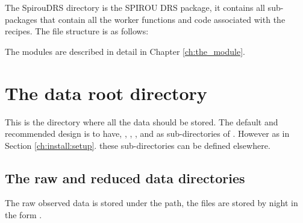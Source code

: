 The SpirouDRS directory is the SPIROU DRS package, it contains all sub-packages that contain all the worker functions and code associated with the recipes. The file structure is as follows:

\begin{tcustomdir}
\end{tcustomdir}

The modules are described in detail in Chapter \ref{ch:the_module}.

\fi

\clearpage
\newpage
\section{The data root directory}
\label{ch:data_architecture:data_root_folder}

This is the directory where all the data should be stored. The default and recommended design is to have, , , , and  as sub-directories of . However as in Section \ref{ch:install:setup}. these sub-directories can be defined elsewhere.

\subsection{The raw and reduced data directories}
\label{ch:data_architecture:data_root_folderraw_folder}
The raw observed data is stored under the  path, the files are stored by night in the form \constantFolderDateFormat. \\

